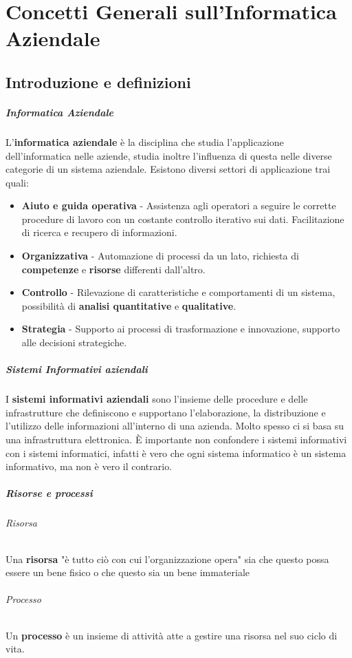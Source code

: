 \chapter[Concetti Generali]{Concetti Generali sull'Informatica Aziendale}
\thispagestyle{chapterInit}
\section{Introduzione e definizioni}
    \paragraph{Informatica Aziendale} L'\textbf{informatica aziendale} è la disciplina che studia l'applicazione dell'informatica nelle aziende, studia inoltre l'influenza di questa nelle diverse categorie di un sistema aziendale. Esistono diversi settori di applicazione trai quali:
        \begin{itemize}
            \item \textbf{Aiuto e guida operativa} - Assistenza agli operatori a seguire le corrette procedure di lavoro con un costante controllo iterativo sui dati. Facilitazione di ricerca e recupero di informazioni.
            \item \textbf{Organizzativa} - Automazione di processi da un lato, richiesta di \textbf{competenze} e \textbf{risorse} differenti dall'altro.
            \item \textbf{Controllo} - Rilevazione di caratteristiche e comportamenti di un sistema, possibilità di \textbf{analisi quantitative} e \textbf{qualitative}.
            \item \textbf{Strategia} - Supporto ai processi di trasformazione e innovazione, supporto alle decisioni strategiche. 
        \end{itemize}
    \paragraph{Sistemi Informativi aziendali} I \textbf{sistemi informativi aziendali} sono l'insieme delle procedure e delle infrastrutture che definiscono e supportano l'elaborazione, la distribuzione e l'utilizzo delle informazioni all'interno di una azienda. Molto spesso ci si basa su una infrastruttura elettronica. È importante non confondere i sistemi informativi con i sistemi informatici, infatti è vero che ogni sistema informatico è un sistema informativo, ma non è vero il contrario.
    \paragraph{Risorse e processi}
        \subparagraph{Risorsa } Una \textbf{risorsa} "è tutto ciò con cui l'organizzazione opera" sia che questo possa essere un bene fisico o che questo sia un bene immateriale
        \subparagraph{Processo } Un \textbf{processo} è un insieme di attività atte a gestire una risorsa nel suo ciclo di vita.
